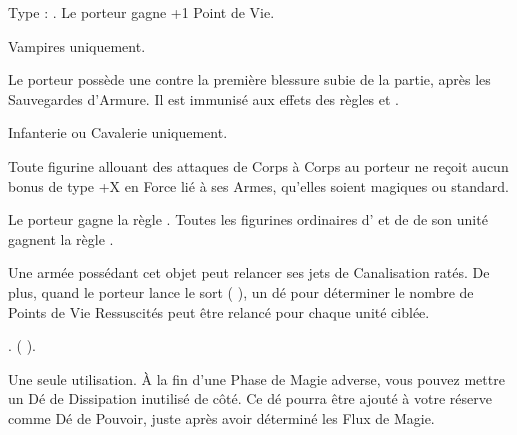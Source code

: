 \endpricelist

\armymagicalarmour

\startpricelist

 Type : \platearmour{}. Le porteur gagne +1 Point de Vie.

\endpricelist

\armytalismans

\startpricelist

 Vampires uniquement.

Le porteur possède une  contre la première blessure subie de la partie, après les Sauvegardes d'Armure. Il est immunisé aux effets des règles  et \multiplewounds{}{}.

 Infanterie ou Cavalerie uniquement.

Toute figurine allouant des attaques de Corps à Corps au porteur ne reçoit aucun bonus de type +X en Force lié à ses Armes, qu'elles soient magiques ou standard.

\endpricelist

\armyenchanteditems

\startpricelist

 Le porteur gagne la règle \distracting{}. Toutes les figurines ordinaires d'\infantry{} et de \cavalry{} de son unité gagnent la règle \parry{}.

\endpricelist

\armyarcaneitems

\startpricelist

 Une armée possédant cet objet peut relancer ses jets de Canalisation ratés. De plus, quand le porteur lance le sort \necromancysignature{} (\Pathof{} \necromancy{}), un dé pour déterminer le nombre de Points de Vie Ressuscités peut être relancé pour chaque unité ciblée.

 . \necromancyspelltwo{} (\Pathof{} \necromancy{}).

 Une seule utilisation. À la fin d'une Phase de Magie adverse, vous pouvez mettre un Dé de Dissipation inutilisé de côté. Ce dé pourra être ajouté à votre réserve comme Dé de Pouvoir, juste après avoir déterminé les Flux de Magie.

\endpricelist

\armymagicalbanners

